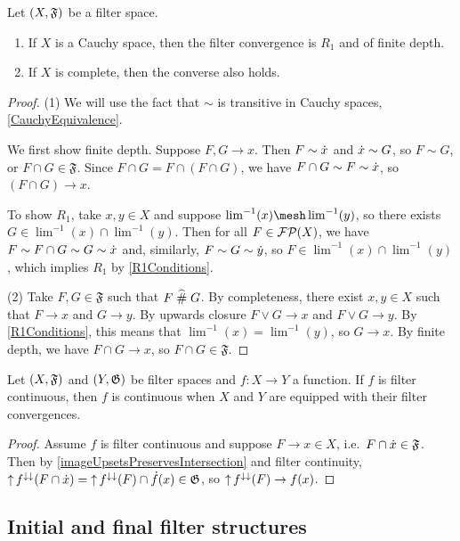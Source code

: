 \begin{lemma}
Let $\sSet{X, \mathfrak{F}}$ be a filter space.
\begin{enumerate}
\item If $X$ is a Cauchy space, then the filter convergence is $R_1$ and of finite depth.
\item If $X$ is complete, then the converse also holds.
\end{enumerate}
\end{lemma}
\begin{proof}
(1) We will use the fact that $\sim$ is transitive in Cauchy spaces, \ref{CauchyEquivalence}.

We first show finite depth. Suppose $F,G\to x$. Then $F\sim \dot{x}$ and $\dot{x} \sim G$, so $F\sim G$, or $F\cap G\in\mathfrak{F}$. Since $F\cap G = F\cap (F\cap G)$, we have $F\cap G\sim F\sim \dot{x}$, so $(F\cap G)\to x$.

To show $R_1$, take $x,y\in X$ and suppose $\lim^{-1}(x)\mesh \lim^{-1}(y)$, so there exists $G\in \lim^{-1}(x)\cap \lim^{-1}(y)$. Then for all $F\in \operatorname{\mathcal{FP}}(X)$, we have $F\sim F\cap G \sim G\sim \dot{x}$ and, similarly, $F\sim G\sim \dot{y}$, so $F\in \lim^{-1}(x)\cap \lim^{-1}(y)$, which implies $R_1$ by \ref{R1Conditions}.

(2) Take $F,G \in\mathfrak{F}$ such that $F\mathrel{\widehat{\#}} G$. By completeness, there exist $x,y\in X$ such that $F\to x$ and $G\to y$. By upwards closure $F\vee G \to x$ and $F\vee G\to y$. By \ref{R1Conditions}, this means that $\lim^{-1}(x) = \lim^{-1}(y)$, so $G\to x$. By finite depth, we have $F\cap G \to x$, so $F\cap G\in \mathfrak{F}$.
\end{proof}

\begin{proposition}
Let $\sSet{X,\mathfrak{F}}$ and $\sSet{Y,\mathfrak{G}}$ be filter spaces and $f: X\to Y$ a function. If $f$ is filter continuous, then $f$ is continuous when $X$ and $Y$ are equipped with their filter convergences.
\end{proposition}
\begin{proof}
Assume $f$ is filter continuous and suppose $F\to x\in X$, i.e.\ $F\cap \dot{x}\in \mathfrak{F}$. Then by \ref{imageUpsetsPreservesIntersection} and filter continuity, $\operatorname{\uparrow} f^{\downarrow\downarrow}(F\cap \dot{x}) = \operatorname{\uparrow} f^{\downarrow\downarrow}(F) \cap \dot{f}(x) \in \mathfrak{G}$, so $\operatorname{\uparrow} f^{\downarrow\downarrow}(F) \to f(x)$.
\end{proof}

\subsection{Initial and final filter structures}
